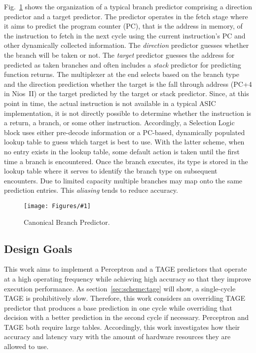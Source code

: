 \documentclass[conference]{IEEEtran}
\newcommand{\kfig}[4]{ %
        \begin{figure}[!t]
        \centering
        \texttt{[image: Figures/\#1]}
        \vspace{-1mm}
        \caption{#3}
        \label{#2}
        \end{figure}
}
\begin{document}
Fig.~\ref{fig:bpcanonical} shows the organization of a typical branch predictor comprising a direction predictor and a target predictor.  The predictor operates in the fetch stage where it aims to predict the program counter (PC), that is the address in memory, of the instruction to fetch in the next cycle using the current instruction's PC and other dynamically collected information. The \textit{direction} predictor guesses whether the branch will be taken or not. The \textit{target} predictor guesses the address for predicted as taken branches and often includes a \textit{stack} predictor for predicting function returns. The multiplexer at the end selects based on the branch type and the direction prediction whether the target is the fall through address (PC+4 in Nios~II) or the target predicted by the target or stack predictor. Since, at this point in time, the actual instruction is not available in a typical ASIC implementation, it is not directly possible to determine whether the instruction is a return, a branch, or some other instruction. Accordingly, a Selection Logic block uses either pre-decode information or a PC-based, dynamically populated lookup table to guess which target is best to use. With the latter scheme, when no entry exists in the lookup table, some default action is taken until the first time a branch is encountered. Once the branch executes, its type is stored in the lookup table where it serves to identify the branch type on subsequent encounters. Due to limited capacity multiple branches may map onto the same prediction entries. This \textit{aliasing} tends to reduce accuracy.
\kfig{bpcanonical.pdf}{fig:bpcanonical}{Canonical Branch Predictor.}{angle = 0, trim = 0.2in 1.7in 0.4in 0.1in, clip, width=0.4\textwidth}

\subsection{Design Goals}
\label{sec:background:goal}

This work aims to implement a Perceptron and a TAGE predictors that operate at a high operating frequency while achieving high accuracy so that they improve execution performance. As section~\ref{sec:scheme:tage} will show, a single-cycle TAGE is prohibitively slow. Therefore, this work considers an overriding TAGE predictor that produces a base prediction in one cycle while overriding that decision with a better prediction in the second cycle if necessary. Perceptron and TAGE both require large tables. Accordingly, this work investigates how their accuracy and latency vary with the amount of hardware resources they are allowed to use.
\end{document}
